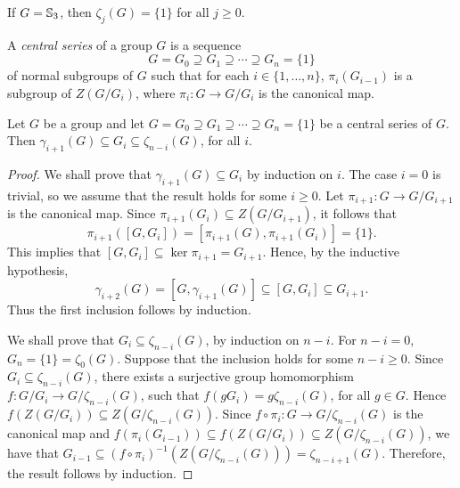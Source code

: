 \begin{example}
	If $G=\mathbb{S}_3$, then $\zeta_j(G)=\{1\}$ for all $j\geq 0$.
	\end{example}

A {\em central series} of a group $G$ is a sequence
\[
	G=G_0\supseteq G_1\supseteq\cdots\supseteq G_n=\{1\}
\]
of normal subgroups of $G$ such that for each $i\in\{1,\dots,n\}$, 
$\pi_i(G_{i-1})$ is a subgroup of $Z(G/G_i)$, where $\pi_i\colon G\to
G/G_i$ is the canonical map. 

\begin{proposition}
	\label{pro:serie_central}
	Let $G$ be a group and let $G=G_0\supseteq G_1\supseteq\cdots\supseteq G_n=\{1\}$
	be a central series of $G$. Then $\gamma_{i+1}(G)\subseteq G_i\subseteq \zeta_{n-i}(G)$, for all $i$.
\end{proposition}

\begin{proof}
    We shall prove that $\gamma_{i+1}(G)\subseteq G_i$ by induction on $i$. 
	The case $i=0$ is trivial, so we assume that 
	the result holds for some 
	$i\geq 0$. 
	Let $\pi_{i+1}\colon G\to G/G_{i+1}$ is the canonical map. 
	Since $\pi_{i+1}(G_{i})\subseteq Z(G/G_{i+1})$, it follows that
	\[
	\pi_{i+1}([G,G_{i}])=[\pi_{i+1}(G),\pi_{i+1}(G_{i})]=\{1\}.
	\]
	This implies that $[G,G_{i}]\subseteq\ker\pi_{i+1}=G_{i+1}$. Hence, by the inductive hypothesis,
	\[
	\gamma_{i+2}(G)=[G,\gamma_{i+1}(G)]\subseteq [G,G_{i}]\subseteq G_{i+1}. 
	\] Thus the first inclusion follows by induction.
	
	We shall prove that $G_i\subseteq \zeta_{n-i}(G)$, by induction on $n-i$. For $n-i=0$, $G_n=\{ 1\}=\zeta_0(G)$. Suppose that the
	inclusion holds for some $n-i\geq 0$. Since $G_i\subseteq \zeta_{n-i}(G)$, there exists a surjective group homomorphism
	$f\colon G/G_i\rightarrow G/\zeta_{n-i}(G)$, such that $f(gG_i)=g\zeta_{n-i}(G)$, for all $g\in G$. 
	Hence $f(Z(G/G_i))\subseteq Z(G/\zeta_{n-i}(G))$. Since  $f\circ\pi_i\colon G\rightarrow G/\zeta_{n-i}(G)$ is the canonical map and
	$f(\pi_i(G_{i-1}))\subseteq f(Z(G/G_i))\subseteq Z(G/\zeta_{n-i}(G))$, we have that 
	$G_{i-1}\subseteq (f\circ \pi_i)^{-1}(Z(G/\zeta_{n-i}(G)))=\zeta_{n-i+1}(G)$. Therefore, the result follows by induction.
\end{proof}






